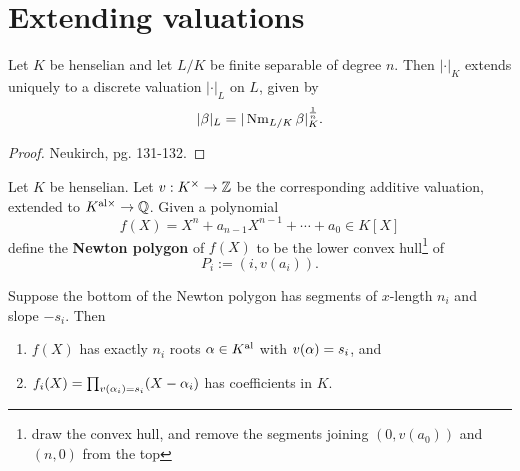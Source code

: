 \section{Extending valuations}
\begin{thm}
Let $K$ be henselian %
and let $L/K$ be finite separable of degree $n$. Then $|\cdot|_K$ extends uniquely to a discrete valuation $|\cdot|_L$ on $L$, given by
\[
|\beta|_L=|\operatorname{Nm}_{L/K}\beta|_K^{\frac{1}{n}}.
\]
\end{thm}
\begin{proof}
Neukirch, pg. 131-132.
\end{proof}
\begin{df}
Let $K$ be henselian. Let $v:K^{\times}\to \mathbb{Z}$ be the corresponding additive valuation, extended to $K^{\text{al}\times}\to \mathbb{Q}$. Given a polynomial
\[
f(X)=X^n+a_{n-1}X^{n-1}+\cdots +a_0\in K[X]
\]
define the \textbf{Newton polygon} of $f(X)$ to be the lower convex hull\footnote{draw the convex hull, and remove the segments joining $(0,v(a_0))$ and $(n,0)$ from the top}
 of
\[
P_i:=(i,v(a_{i})).
\]
\end{df}
\begin{pr}
Suppose the bottom of the Newton polygon has segments of $x$-length $n_i$ and slope $-s_i$. Then 
\begin{enumerate}
\item $f(X)$ has exactly $n_i$ roots $\alpha\in K^{\text{al}}$ with $v(\alpha)=s_i$, and
\item $f_i(X)=\prod_{v(\alpha_i)=s_i} (X-\alpha_i)$ has coefficients in $K$.
\end{enumerate}
\end{pr}
